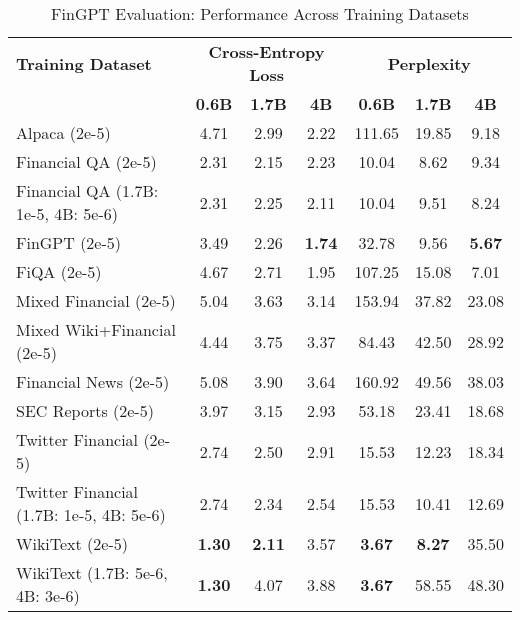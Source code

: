 
\begin{table}[htbp]
\centering
\caption[FinGPT Evaluation: Cross-Dataset Performance]{FinGPT Evaluation: Performance Across Training Datasets}
\label{tab:cross_fingpt}
\begin{tabular}{l|ccc|ccc}
\hline
\textbf{Training Dataset} & \multicolumn{3}{c|}{\textbf{Cross-Entropy Loss}} & \multicolumn{3}{c}{\textbf{Perplexity}} \\
\cline{2-4} \cline{5-7}
  & \textbf{0.6B} & \textbf{1.7B} & \textbf{4B} & \textbf{0.6B} & \textbf{1.7B} & \textbf{4B} \\
Alpaca (2e-5) & 4.71 & 2.99 & 2.22 & 111.65 & 19.85 & 9.18  \\
Financial QA (2e-5) & 2.31 & 2.15 & 2.23 & 10.04 & 8.62 & 9.34  \\
Financial QA (1.7B: 1e-5, 4B: 5e-6) & 2.31 & 2.25 & 2.11 & 10.04 & 9.51 & 8.24  \\
FinGPT (2e-5) & 3.49 & 2.26 & \textbf{1.74} & 32.78 & 9.56 & \textbf{5.67}  \\
FiQA (2e-5) & 4.67 & 2.71 & 1.95 & 107.25 & 15.08 & 7.01  \\
Mixed Financial (2e-5) & 5.04 & 3.63 & 3.14 & 153.94 & 37.82 & 23.08  \\
Mixed Wiki+Financial (2e-5) & 4.44 & 3.75 & 3.37 & 84.43 & 42.50 & 28.92  \\
Financial News (2e-5) & 5.08 & 3.90 & 3.64 & 160.92 & 49.56 & 38.03  \\
SEC Reports (2e-5) & 3.97 & 3.15 & 2.93 & 53.18 & 23.41 & 18.68  \\
Twitter Financial (2e-5) & 2.74 & 2.50 & 2.91 & 15.53 & 12.23 & 18.34  \\
Twitter Financial (1.7B: 1e-5, 4B: 5e-6) & 2.74 & 2.34 & 2.54 & 15.53 & 10.41 & 12.69  \\
WikiText (2e-5) & \textbf{1.30} & \textbf{2.11} & 3.57 & \textbf{3.67} & \textbf{8.27} & 35.50  \\
WikiText (1.7B: 5e-6, 4B: 3e-6) & \textbf{1.30} & 4.07 & 3.88 & \textbf{3.67} & 58.55 & 48.30  \\
\hline
\end{tabular}
\end{table}

